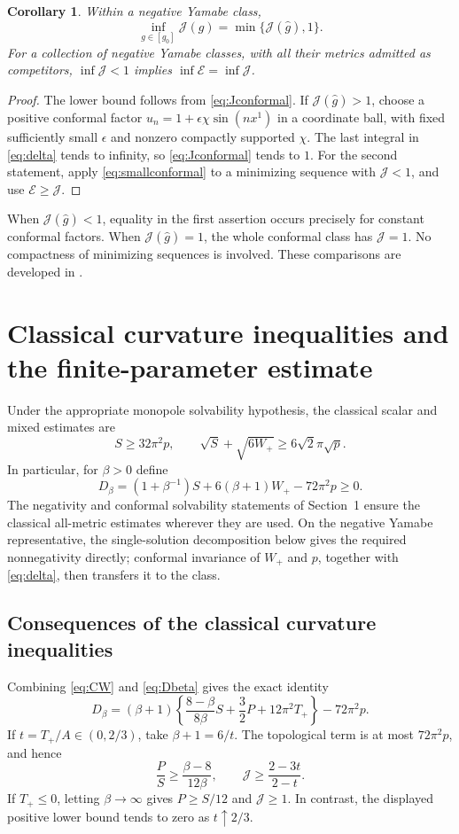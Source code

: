 \documentclass[11pt,a4paper]{article}
\newtheorem{corollary}[theorem]{Corollary}
\theoremstyle{definition}
\theoremstyle{remark}
\newcommand{\J}{\mathcal J}
\newcommand{\E}{\mathcal E}
\begin{document}
\begin{corollary}\label{cor:infima}
Within a negative Yamabe class,
\[
 \inf_{g\in[g_0]}\J(g)=\min\{\J(\widehat g),1\}.
\]
For a collection of negative Yamabe classes, with all their metrics admitted as competitors, $\inf\J<1$ implies $\inf\E=\inf\J$.
\end{corollary}
\begin{proof}
The lower bound follows from \eqref{eq:Jconformal}. If $\J(\widehat g)>1$, choose a positive conformal factor $u_n=1+\epsilon\chi\sin(nx^1)$ in a coordinate ball, with fixed sufficiently small $\epsilon$ and nonzero compactly supported $\chi$. The last integral in \eqref{eq:delta} tends to infinity, so \eqref{eq:Jconformal} tends to $1$. For the second statement, apply \eqref{eq:smallconformal} to a minimizing sequence with $\J<1$, and use $\E\ge\J$.
\end{proof}

When $\J(\widehat g)<1$, equality in the first assertion occurs precisely for constant conformal factors. When $\J(\widehat g)=1$, the whole conformal class has $\J=1$. No compactness of minimizing sequences is involved. These comparisons are developed in \cite{Conformal,N1source}.

\section{Classical curvature inequalities and the finite-parameter estimate}
Under the appropriate monopole solvability hypothesis, the classical scalar and mixed estimates are
\begin{equation}
 S\ge32\pi^2p,\qquad \sqrt S+\sqrt{6W_+}\ge6\sqrt2\pi\sqrt p.
 \label{eq:classical}
\end{equation}
In particular, for $\beta>0$ define
\begin{equation}
 D_\beta=(1+\beta^{-1})S+6(\beta+1)W_+-72\pi^2p\ge0.
 \label{eq:Dbeta}
\end{equation}
The negativity and conformal solvability statements of Section~1 ensure the classical all-metric estimates wherever they are used. On the negative Yamabe representative, the single-solution decomposition below gives the required nonnegativity directly; conformal invariance of $W_+$ and $p$, together with \eqref{eq:delta}, then transfers it to the class.

\subsection{Consequences of the classical curvature inequalities}
Combining \eqref{eq:CW} and \eqref{eq:Dbeta} gives the exact identity
\begin{equation}
 D_\beta=(\beta+1)\left\{\frac{8-\beta}{8\beta}S+\frac32P+12\pi^2T_+\right\}-72\pi^2p.
 \label{eq:D-CW}
\end{equation}
If $t=T_+/A\in(0,2/3)$, take $\beta+1=6/t$. The topological term is at most $72\pi^2p$, and hence
\[
 \frac PS\ge\frac{\beta-8}{12\beta},\qquad
 \J\ge\frac{2-3t}{2-t}.
\]
If $T_+\le0$, letting $\beta\to\infty$ gives $P\ge S/12$ and $\J\ge1$. In contrast, the displayed positive lower bound tends to zero as $t\uparrow2/3$.
\end{document}
